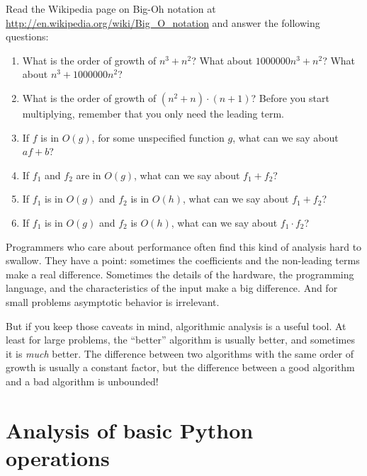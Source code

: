 \documentclass[10pt]{book}
\begin{document}
\begin{exercise}

Read the Wikipedia page on Big-Oh notation at
\url{http://en.wikipedia.org/wiki/Big_O_notation} and
answer the following questions:

\begin{enumerate}
\item What is the order of growth of $n^3 + n^2$?
What about $1000000 n^3 + n^2$?
What about $n^3 + 1000000 n^2$?

\item What is the order of growth of $(n^2 + n) \cdot (n + 1)$?  Before
  you start multiplying, remember that you only need the leading term.

\item If $f$ is in $O(g)$, for some unspecified function $g$, what can
  we say about $af+b$?

\item If $f_1$ and $f_2$ are in $O(g)$, what can we say about $f_1 + f_2$?

\item If  $f_1$ is in $O(g)$
and $f_2$ is in $O(h)$,
what can we say about  $f_1 + f_2$?

\item If  $f_1$ is in $O(g)$ and $f_2$ is $O(h)$,
what can we say about  $f_1 \cdot f_2$?
\end{enumerate}

\end{exercise}

Programmers who care about performance often find this kind of
analysis hard to swallow.  They have a point: sometimes the
coefficients and the non-leading terms make a real difference.
Sometimes the details of the hardware, the programming language, and
the characteristics of the input make a big difference.  And for small
problems asymptotic behavior is irrelevant.

But if you keep those caveats in mind, algorithmic analysis is a
useful tool.  At least for large problems, the ``better'' algorithm
is usually better, and sometimes it is {\em much} better.  The
difference between two algorithms with the same order of growth is
usually a constant factor, but the difference between a good algorithm
and a bad algorithm is unbounded!


\section{Analysis of basic Python operations}
\end{document}
